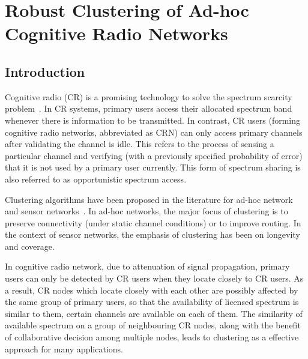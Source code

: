 \chapter{Robust Clustering of Ad-hoc Cognitive Radio Networks}
\section{Introduction}
\label{intro}
Cognitive radio (CR) is a promising technology to solve the spectrum scarcity problem~\cite{Mitola}. 
In CR systems, primary users access their allocated spectrum band whenever there is information to be transmitted. 
In contrast, CR users (forming cognitive radio networks, abbreviated as CRN) can only access primary channels after validating the channel is idle. 
This refers to the process of sensing a particular channel and verifying (with a previously specified probability of error) that it is not used by a primary user currently. 
This form of spectrum sharing is also referred to as opportunistic spectrum access.

Clustering algorithms have been proposed in the literature for ad-hoc network~\cite{Kawadia03,Lin97adaptiveclustering,Basagni99} and sensor networks~\cite{Abbasi_survey_07}. 
In ad-hoc networks, the major focus of clustering is to preserve connectivity (under static channel conditions) or to improve routing.
In the context of sensor networks, the emphasis of clustering has been on longevity and coverage.

In cognitive radio network, due to attenuation of signal propagation, primary users can only be detected by CR users when they locate closely to CR users.
As a result, CR nodes which locate closely with each other are possibly affected by the same group of primary users, so that the availability of licensed spectrum is similar to them, \ie certain channels are available on each of them.
The similarity of available spectrum on a group of neighbouring CR nodes, along with the benefit of collaborative decision among multiple nodes, leads to clustering as a effective approach for many applications.

